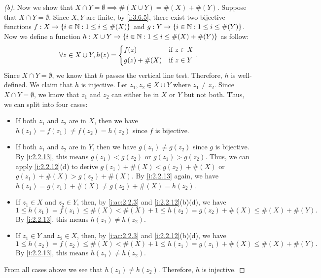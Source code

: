 \begin{proof}[(b)]
  Now we show that \(X \cap Y = \emptyset \implies \#(X \cup Y) = \#(X) + \#(Y)\).
  Suppose that \(X \cap Y = \emptyset\).
  Since \(X, Y\) are finite, by \cref{i:3.6.5}, there exist two bijective functions \(f : X \to \left\lbrace i \in \mathbb{N} : 1 \leq i \leq \#(X)\right\rbrace\) and \(g : Y \to \left\lbrace i \in \mathbb{N} : 1 \leq i \leq \#(Y)\right\rbrace\).
  Now we define a function \(h : X \cup Y \to \left\lbrace i \in \mathbb{N} : 1 \leq i \leq \#(X) + \#(Y)\right\rbrace\) as follow:
  \[
    \forall z \in X \cup Y, h(z) = \begin{dcases}
      f(z)         & \text{if } z \in X \\
      g(z) + \#(X) & \text{if } z \in Y
    \end{dcases}.
  \]
  Since \(X \cap Y = \emptyset\), we know that \(h\) passes the vertical line test.
  Therefore, \(h\) is well-defined.
  We claim that \(h\) is injective.
  Let \(z_1, z_2 \in X \cup Y\) where \(z_1 \neq z_2\).
  Since \(X \cap Y = \emptyset\), we know that \(z_1\) and \(z_2\) can either be in \(X\) or \(Y\) but not both.
  Thus, we can split into four cases:
  \begin{itemize}
    \item If both \(z_1\) and \(z_2\) are in \(X\), then we have \(h(z_1) = f(z_1) \neq f(z_2) = h(z_2)\) since \(f\) is bijective.
    \item If both \(z_1\) and \(z_2\) are in \(Y\), then we have \(g(z_1) \neq g(z_2)\) since \(g\) is bijective.
          By \cref{i:2.2.13}, this means \(g(z_1) < g(z_2)\) or \(g(z_1) > g(z_2)\).
          Thus, we can apply \cref{i:2.2.12}(d) to derive \(g(z_1) + \#(X) < g(z_2) + \#(X)\) or \(g(z_1) + \#(X) > g(z_2) + \#(X)\).
          By \cref{i:2.2.13} again, we have \(h(z_1) = g(z_1) + \#(X) \neq g(z_2) + \#(X) = h(z_2)\).
    \item If \(z_1 \in X\) and \(z_2 \in Y\), then, by \cref{i:ac:2.2.3} and \cref{i:2.2.12}(b)(d), we have
          \[
            1 \leq h(z_1) = f(z_1) \leq \#(X) < \#(X) + 1 \leq h(z_2) = g(z_2) + \#(X) \leq \#(X) + \#(Y).
          \]
          By \cref{i:2.2.13}, this means \(h(z_1) \neq h(z_2)\).
    \item If \(z_1 \in Y\) and \(z_2 \in X\), then, by \cref{i:ac:2.2.3} and \cref{i:2.2.12}(b)(d), we have
          \[
            1 \leq h(z_2) = f(z_2) \leq \#(X) < \#(X) + 1 \leq h(z_1) = g(z_1) + \#(X) \leq \#(X) + \#(Y).
          \]
          By \cref{i:2.2.13}, this means \(h(z_1) \neq h(z_2)\).
  \end{itemize}
  From all cases above we see that \(h(z_1) \neq h(z_2)\).
  Therefore, \(h\) is injective.

\end{proof}
